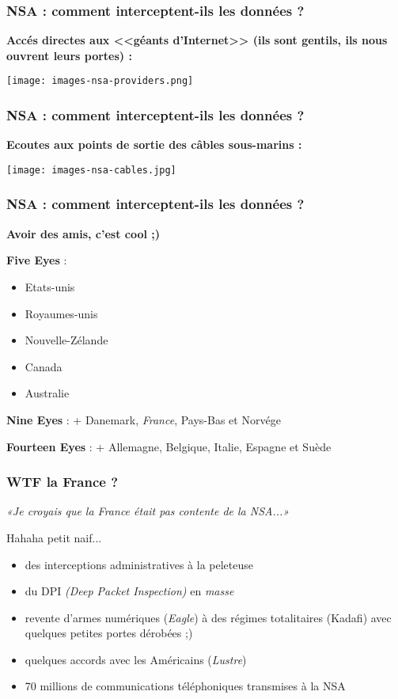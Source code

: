 \begin{frame}\frametitle{NSA : comment interceptent-ils les données ?}
    \textbf{Accés directes aux <<géants d'Internet>> (ils sont gentils, ils
    nous ouvrent leurs portes) :}
    \vspace{1em}
    \begin{center}
        \texttt{[image: images-nsa-providers.png]}
    \end{center}
\end{frame}


\begin{frame}\frametitle{NSA : comment interceptent-ils les données ?}
    \textbf{Ecoutes aux points de sortie des câbles sous-marins :}
    \vspace{1em}
    \begin{center}
        \texttt{[image: images-nsa-cables.jpg]}
    \end{center}
\end{frame}


\begin{frame}\frametitle{NSA : comment interceptent-ils les données ?}
    {\center \huge \bfseries Avoir des amis, c'est cool ;)}

    \vspace{1em}
    \textbf{Five Eyes} :
    \begin{itemize}
        \item Etats-unis
        \item Royaumes-unis
        \item Nouvelle-Zélande
        \item Canada
        \item Australie
    \end{itemize}
    \textbf{Nine Eyes} : + Danemark, \emph{France}, Pays-Bas et Norvége

    \textbf{Fourteen Eyes} : + Allemagne, Belgique, Italie, Espagne et Suède
\end{frame}


\begin{frame}\frametitle{WTF la France ?}
    \emph{«Je croyais que la France était pas contente de la NSA...»}
    
    Hahaha petit naif...

    \vspace{1em}
    \begin{itemize}
        \item des interceptions administratives à la peleteuse
        \item du DPI \emph{(Deep Packet Inspection)} en \emph{masse}
        \item revente d'armes numériques (\emph{Eagle}) à des régimes totalitaires
            (Kadafi) avec quelques petites portes dérobées ;)
        \item quelques accords avec les Américains (\emph{Lustre})
        \item 70 millions de communications téléphoniques transmises à la NSA
    \end{itemize}
\end{frame}

